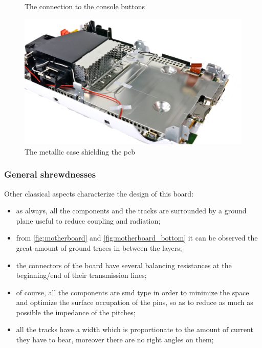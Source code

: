 \documentclass[11pt,a4paper,titlepage]{article}
\begin{document}
\begin{figure}[h]
\begin{minipage}{.5 \textwidth}
						\caption{The connection to the console buttons}
						\label{fig:button}
				  \end{minipage}
				  \hspace{5mm}
				  \begin{minipage}{.5 \textwidth}
						\centering
						\includegraphics[width = .8\textwidth]{shield.png}
						\caption{The metallic case shielding the \gls{pcb}}
						\label{fig:metalliccase}
				  \end{minipage}
				\end{figure}

		  \subsubsection{General shrewdnesses}
				Other classical aspects characterize the design of this board:
				\begin{itemize}
				  \item as always, all the components and the tracks are surrounded by a ground plane useful to reduce coupling and radiation;
				  \item from \autoref{fig:motherboard} and \autoref{fig:motherboard_bottom} it can be observed the great amount of ground traces in between the layers;
				  \item the connectors of the board have several balancing resistances at the beginning/end of their transmission lines;
				  \item of course, all the components are \gls{smd} type in order to minimize the space and optimize the surface occupation of the pins, so as to reduce as much as possible the impedance of the pitches;
				  \item all the tracks have a width which is proportionate to the amount of current they have to bear, moreover there are no right angles on them;
				\end{itemize}
\end{document}
